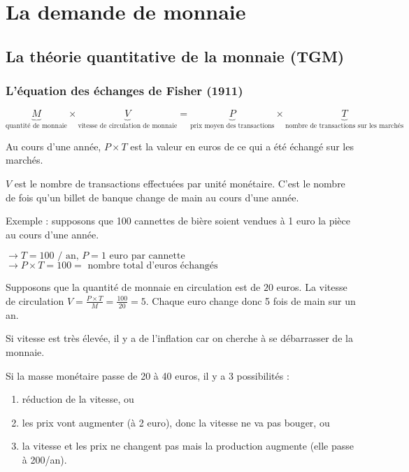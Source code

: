 \chapter{La demande de monnaie}

\section{La théorie quantitative de la monnaie (TGM)}

	\subsection{L'équation des échanges de Fisher (1911)}
	
	$$\underbrace{M}_{\text{quantité de monnaie}} \times \underbrace{V}_{\text{vitesse de circulation de monnaie}} = \underbrace{P}_{\text{prix moyen des transactions}} \times \underbrace{T}_{\text{nombre de transactions sur les marchés}}$$
	
	Au cours d'une année, $P \times T$ est la valeur en euros de ce qui a été échangé sur les marchés.
	
	$V$ est le nombre de transactions effectuées par unité monétaire. C'est le nombre de fois qu'un billet de banque change de main au cours d'une année.
	
	Exemple : supposons que 100 cannettes de bière soient vendues à 1 euro la pièce au cours d'une année.
	
	$\rightarrow T = 100\text{ / an, } P = 1 \text{ euro par cannette}$
	$\rightarrow P \times T = 100 = \text{ nombre total d'euros échangés}$
	
	Supposons que la quantité de monnaie en circulation est de $20$ euros. La vitesse de circulation $V = \frac{P \times T}{M} = \frac{100}{20} = 5$. Chaque euro change donc 5 fois de main sur un an.
	
	Si vitesse est très élevée, il y a de l'inflation car on cherche à se débarrasser de la monnaie.
	
	Si la masse monétaire passe de 20 à 40 euros, il y a 3 possibilités :
	
	\begin{enumerate}
		\item réduction de la vitesse, ou
		\item les prix vont augmenter (à 2 euro), donc la vitesse ne va pas bouger, ou
		\item la vitesse et les prix ne changent pas mais la production augmente (elle passe à 200/an).
	\end{enumerate}
	
